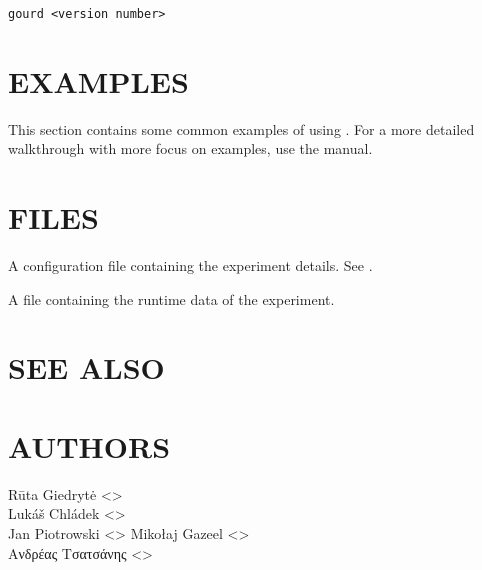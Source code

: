 \documentclass[a4paper,english]{article}
\begin{document}
\begin{adjustwidth}{18pt}{0pt}
                \texttt{gourd <version number>}



    \section{EXAMPLES}

        This section contains some common examples of using .
        For a more detailed walkthrough with more focus on examples, use the  manual.


    \section{FILES}

        \begin{Description}[Files]\setlength{\itemsep}{0cm}
            \item[\File{gourd.toml}] A configuration file containing the experiment details. See .
            \item[\File{<experiment-dir>/<experiment-number>.lock}] A file containing the runtime data of the experiment.
        \end{Description}

    \section{SEE ALSO}



    \section{AUTHORS}
    Rūta Giedrytė <>\\[0.1cm]\MANbr
    Lukáš Chládek <>\\[0.1cm]\MANbr
    Jan Piotrowski <>
    Mikołaj Gazeel <>\\[0.1cm]\MANbr
    Ανδρέας Τσατσάνης <>\\[0.1cm]\MANbr
\end{adjustwidth}
\end{document}

